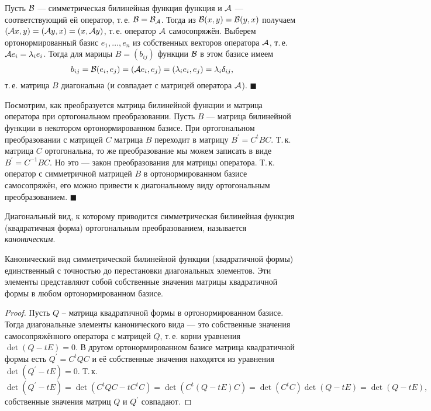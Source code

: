 \smallskip
{}
Пусть $\mathcal{B}$ --- симметрическая билинейная функция функция и $\mathcal{A}$ --- соответствующий ей оператор, т.\,е. $\mathcal{B} = \mathcal{B}_{\mathcal{A}}$. Тогда из $\mathcal{B}(x, y) = \mathcal{B}(y, x)$ получаем $(\mathcal{A} x, y) = (\mathcal{A} y, x) = (x, \mathcal{A} y)$, т.\,е. оператор $\mathcal{A}$ самосопряжён. Выберем ортонормированный базис $e_1, \ldots, e_n$ из собственных векторов оператора $\mathcal{A}$, т.\,е. $\mathcal{A} e_i = \lambda_ie_i$. Тогда для марицы $B = (b_{ij})$ функции $\mathcal{B}$ в этом базисе имеем
\[
    b_{ij} = \mathcal{B}(e_i, e_j) = (\mathcal{A} e_i, e_j) = (\lambda_ie_i, e_j) = \lambda_i\delta_{ij},
\]
т.\,е. матрица $B$ диагональна (и совпадает с матрицей оператора $\mathcal{A}$).
\hfill$\blacksquare$\par\smallskip

\smallskip
{}
Посмотрим, как преобразуется матрица билинейной функции и матрица оператора при ортогональном преобразовании. Пусть $B$ --- матрица билинейной функции в некотором ортонормированном базисе. При ортогональном преобразовании с матрицей $C$ матрица $B$ переходит в матрицу $B^\prime = C^tBC$. Т.\,к. матрица $C$ ортогональна, то же преобразование мы можем записать в виде $B^\prime = C^{-1}BC$. Но это --- закон преобразования для матрицы оператора. Т.\,к. оператор с симметричной матрицей $B$ в ортонормированном базисе самосопряжён, его можно привести к диагональному виду ортогональным преобразованием.
\hfill$\blacksquare$\par\smallskip

Диагональный вид, к которому приводится симметрическая билинейная функция (квадратичная форма) ортогональным преобразованием, называется \textit{каноническим}.

\begin{proposal}
    Канонический вид симметрической билинейной функции (квадратичной формы) единственный с точностью до перестановки диагональных элементов. Эти элементы представляют собой собственные значения матрицы квадратичной формы в любом ортонормированном базисе.
\end{proposal}

\begin{proof}
    Пусть $Q$ -- матрица квадратичной формы в ортонормированном базисе. Тогда диагональные элементы канонического вида --- это собственные значения самосопряжённого оператора с матрицей $Q$, т.\,е. корни уравнения $\det(Q - tE) = 0$. В другом ортонормированном базисе матрица квадратичной формы есть $Q^\prime = C^tQC$ и её собственные значения находятся из уравнения $\det(Q^\prime - tE) = 0$. Т.\,к.
    \[
        \det(Q^\prime - tE) = \det(C^tQC - tC^tC) = \det(C^t(Q - tE)C) = \det(C^tC)\det(Q - tE) = \det(Q - tE),
    \]
    собственные значения матриц $Q$ и $Q^\prime$ совпадают.
\end{proof}

